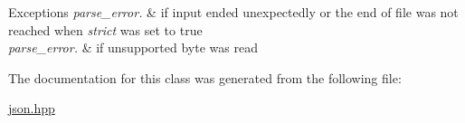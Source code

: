 \begin{DoxyExceptions}{Exceptions}
{\em parse\+\_\+error.} & if input ended unexpectedly or the end of file was not reached when {\itshape strict} was set to true \\
\hline
{\em parse\+\_\+error.} & if unsupported byte was read \\
\hline
\end{DoxyExceptions}


The documentation for this class was generated from the following file\+:\begin{DoxyCompactItemize}
\item 
\hyperlink{json_8hpp}{json.\+hpp}\end{DoxyCompactItemize}
